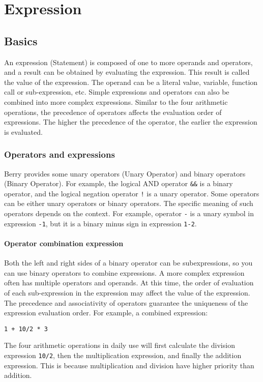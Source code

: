\chapter {Expression}

\section {Basics}

An expression (Statement) is composed of one to more operands and operators, and a result can be obtained by evaluating the expression. This result is called the value of the expression. The operand can be a literal value, variable, function call or sub-expression, etc. Simple expressions and operators can also be combined into more complex expressions. Similar to the four arithmetic operations, the precedence of operators affects the evaluation order of expressions. The higher the precedence of the operator, the earlier the expression is evaluated.

\subsection {Operators and expressions}

Berry provides some unary operators (Unary Operator) and binary operators (Binary Operator). For example, the logical AND operator \texttt{\&\&} is a binary operator, and the logical negation operator \texttt{!} is a unary operator. Some operators can be either unary operators or binary operators. The specific meaning of such operators depends on the context. For example, operator \texttt{-} is a unary symbol in expression \texttt{-1}, but it is a binary minus sign in expression \texttt{1-2}.

\subsubsection {Operator combination expression}

Both the left and right sides of a binary operator can be subexpressions, so you can use binary operators to combine expressions. A more complex expression often has multiple operators and operands. At this time, the order of evaluation of each sub-expression in the expression may affect the value of the expression. The precedence and associativity of operators guarantee the uniqueness of the expression evaluation order. For example, a combined expression:
\begin{lstlisting}[language=berry, numbers=none]
1 + 10/2 * 3
\end{lstlisting}
The four arithmetic operations in daily use will first calculate the division expression \texttt{10/2}, then the multiplication expression, and finally the addition expression. This is because multiplication and division have higher priority than addition.

